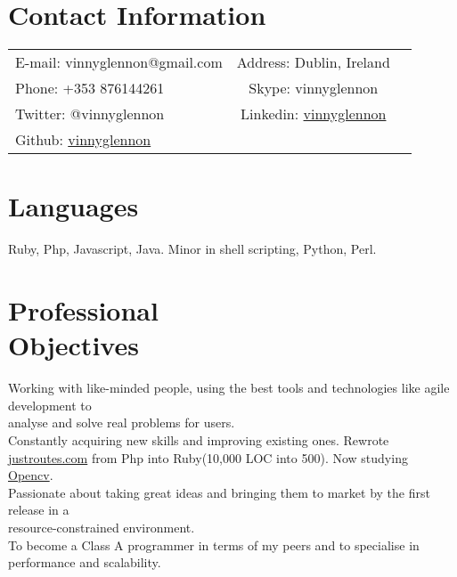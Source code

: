 \documentclass[margin,line]{resume}
\begin{document}
\begin{resume}

    \section{\mysidestyle Contact Information}

    \begin{tabular}{ l c l}
    E-mail: vinnyglennon@gmail.com & Address: Dublin, Ireland\\
    Phone: +353 876144261 & Skype: vinnyglennon\\
    Twitter: @vinnyglennon & Linkedin: \href{http://ie.linkedin.com/in/vinnyglennon}{vinnyglennon}\\
    Github: \href{https://github.com/vinnyglennon}{vinnyglennon} \\
    \end{tabular}

    \section{\mysidestyle Languages}
    Ruby, Php, Javascript, Java. Minor in shell scripting, Python, Perl.

    \section{\mysidestyle Professional \\ Objectives}
    Working with like-minded people, using the best tools and technologies like agile development to \\analyse and solve real problems for users.\vspace{1mm}\\%
    Constantly acquiring new skills and improving existing ones. Rewrote \href{http://justroutes.com}{justroutes.com} from Php into Ruby(10,000 LOC into 500). Now studying \href{http://opencv.willowgarage.com/wiki/}{Opencv}.\vspace{1mm}\\%
    Passionate about taking great ideas and bringing them to market by the first release in a \\resource-constrained environment.\vspace{1mm}\\%
    To become a Class A programmer in terms of my peers and to specialise in performance and scalability.
    

\end{resume}
\end{document}
